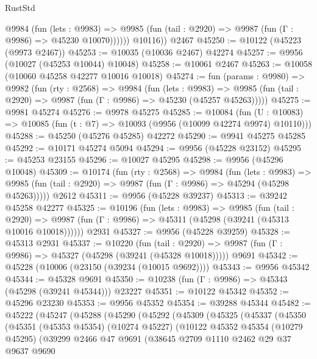 \begin{lexlean}{RustStd}
\begin{coremodule}
            @9984
              (fun (lets : @9983) =>
              @9985 (fun (tail : @2920) => @9987 (fun (Γ : @9986) => @45230 @10070))))))
        @10116))
    @2467
@45250 := @10122 (@45223 (@9973 @2467))
@45253 := @10035 (@10036 @2467) @42274
@45257 := @9956 (@10027 (@45253 @10044) @10048)
@45258 := @10061 @2467
@45263 := @10058 (@10060 @45258 @42277 @10016 @10018)
@45274 := fun (params : @9980) =>
  @9982
    (fun (rty : @2568) =>
    @9984
      (fun (lets : @9983) =>
      @9985 (fun (tail : @2920) => @9987 (fun (Γ : @9986) => @45230 (@45257 @45263)))))
@45275 := @9981 @45274
@45276 := @9978 @45275
@45285 := @10084
    (fun (U : @10083) => @10085 (fun (t : @7) => @10093 (@9956 (@10099 @42274 @9974) @10110)))
@45288 := @45250 (@45276 @45285) @42272
@45290 := @9941 @45275 @45285
@45292 := @10171 @45274 @5094
@45294 := @9956 (@45228 @23152)
@45295 := @45253 @23155
@45296 := @10027 @45295
@45298 := @9956 (@45296 @10048)
@45309 := @10174
    (fun (rty : @2568) =>
    @9984
      (fun (lets : @9983) =>
      @9985 (fun (tail : @2920) => @9987 (fun (Γ : @9986) => @45294 (@45298 @45263)))))
    @2612
@45311 := @9956 (@45228 @39237)
@45313 := @39242 @45258 @42277
@45325 := @10196
    (fun (lets : @9983) =>
    @9985
      (fun (tail : @2920) =>
      @9987 (fun (Γ : @9986) => @45311 (@45298 (@39241 (@45313 @10016 @10018))))))
    @2931
@45327 := @9956 (@45228 @39259)
@45328 := @45313 @2931
@45337 := @10220
    (fun (tail : @2920) => @9987 (fun (Γ : @9986) => @45327 (@45298 (@39241 (@45328 @10018)))))
    @9691
@45342 := @45228 (@10006 (@23150 (@39234 (@10015 @9692))))
@45343 := @9956 @45342
@45344 := @45328 @9691
@45350 := @10238 (fun (Γ : @9986) => @45343 (@45298 (@39241 @45344))) @23227
@45351 := @10122 @45342
@45352 := @45296 @23230
@45353 := @9956 @45352
@45354 := @39288 @45344
@45482 := @45222
    (@45247
      (@45288
        (@45290
          (@45292
            (@45309
              (@45325
                (@45337
                  (@45350
                    (@45351
                      (@45353 @45354)
                      (@10274 @45227)
                      (@10122
                        @45352
                        @45354
                        (@10279 @45295)
                        (@39299
                          @2466
                          @47
                          @9691
                          (@38645
                            @2709
                            @1110
                            @2462
                            @29
                            @37
                            @9637
                            @9690

\end{coremodule}
\end{lexlean}
